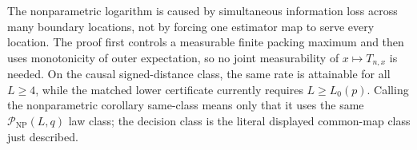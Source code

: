 The nonparametric logarithm is caused by simultaneous information loss across many boundary locations, not by forcing one estimator map to serve every location.  The proof first controls a measurable finite packing maximum and then uses monotonicity of outer expectation, so no joint measurability of \(x\mapsto T_{n,x}\) is needed.  On the causal signed-distance class, the same rate is attainable for all \(L\geq4\), while the matched lower certificate currently requires \(L\geq L_0(p)\).  Calling the nonparametric corollary same-class means only that it uses the same \(\mathcal P_{\mathrm{NP}}(L,q)\) law class; the decision class is the literal displayed common-map class just described.